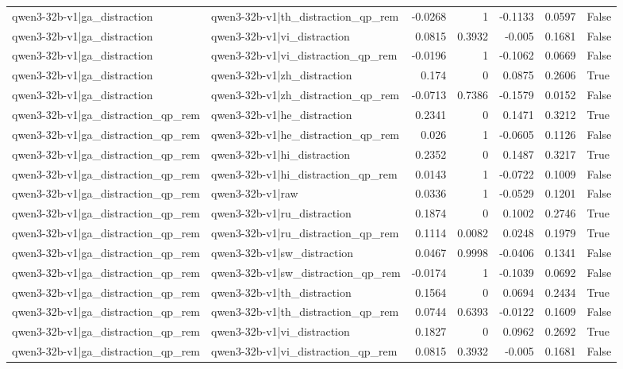 \begin{table}
\begin{tabular}{l l r r r r l}
qwen3-32b-v1|ga_distraction & qwen3-32b-v1|th_distraction_qp_rem & -0.0268 & 1 & -0.1133 & 0.0597 & False \\
qwen3-32b-v1|ga_distraction & qwen3-32b-v1|vi_distraction & 0.0815 & 0.3932 & -0.005 & 0.1681 & False \\
qwen3-32b-v1|ga_distraction & qwen3-32b-v1|vi_distraction_qp_rem & -0.0196 & 1 & -0.1062 & 0.0669 & False \\
qwen3-32b-v1|ga_distraction & qwen3-32b-v1|zh_distraction & 0.174 & 0 & 0.0875 & 0.2606 & True \\
qwen3-32b-v1|ga_distraction & qwen3-32b-v1|zh_distraction_qp_rem & -0.0713 & 0.7386 & -0.1579 & 0.0152 & False \\
qwen3-32b-v1|ga_distraction_qp_rem & qwen3-32b-v1|he_distraction & 0.2341 & 0 & 0.1471 & 0.3212 & True \\
qwen3-32b-v1|ga_distraction_qp_rem & qwen3-32b-v1|he_distraction_qp_rem & 0.026 & 1 & -0.0605 & 0.1126 & False \\
qwen3-32b-v1|ga_distraction_qp_rem & qwen3-32b-v1|hi_distraction & 0.2352 & 0 & 0.1487 & 0.3217 & True \\
qwen3-32b-v1|ga_distraction_qp_rem & qwen3-32b-v1|hi_distraction_qp_rem & 0.0143 & 1 & -0.0722 & 0.1009 & False \\
qwen3-32b-v1|ga_distraction_qp_rem & qwen3-32b-v1|raw & 0.0336 & 1 & -0.0529 & 0.1201 & False \\
qwen3-32b-v1|ga_distraction_qp_rem & qwen3-32b-v1|ru_distraction & 0.1874 & 0 & 0.1002 & 0.2746 & True \\
qwen3-32b-v1|ga_distraction_qp_rem & qwen3-32b-v1|ru_distraction_qp_rem & 0.1114 & 0.0082 & 0.0248 & 0.1979 & True \\
qwen3-32b-v1|ga_distraction_qp_rem & qwen3-32b-v1|sw_distraction & 0.0467 & 0.9998 & -0.0406 & 0.1341 & False \\
qwen3-32b-v1|ga_distraction_qp_rem & qwen3-32b-v1|sw_distraction_qp_rem & -0.0174 & 1 & -0.1039 & 0.0692 & False \\
qwen3-32b-v1|ga_distraction_qp_rem & qwen3-32b-v1|th_distraction & 0.1564 & 0 & 0.0694 & 0.2434 & True \\
qwen3-32b-v1|ga_distraction_qp_rem & qwen3-32b-v1|th_distraction_qp_rem & 0.0744 & 0.6393 & -0.0122 & 0.1609 & False \\
qwen3-32b-v1|ga_distraction_qp_rem & qwen3-32b-v1|vi_distraction & 0.1827 & 0 & 0.0962 & 0.2692 & True \\
qwen3-32b-v1|ga_distraction_qp_rem & qwen3-32b-v1|vi_distraction_qp_rem & 0.0815 & 0.3932 & -0.005 & 0.1681 & False \\

\end{tabular}
\end{table}
